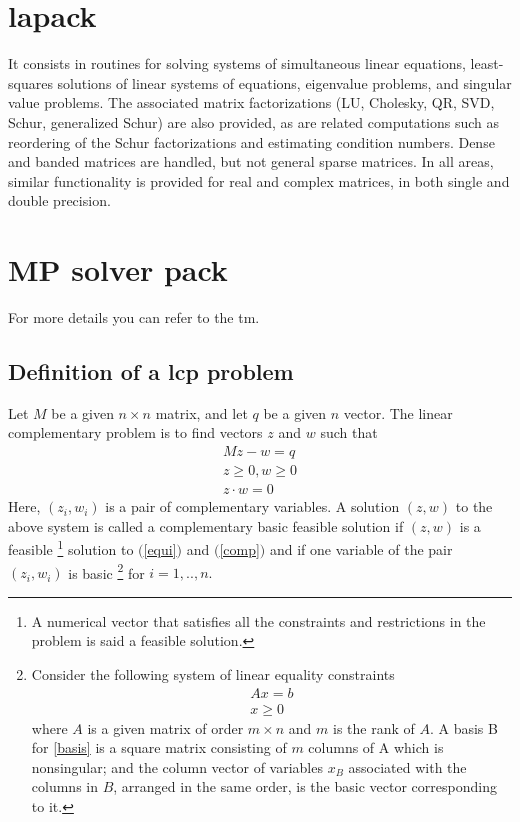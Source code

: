 \section{\ac{lapack}}
It consists in routines for solving systems of simultaneous linear equations, least-squares solutions of linear systems of equations, eigenvalue problems, and singular value problems. The associated matrix factorizations (LU, Cholesky, QR, SVD, Schur, generalized Schur) are also provided, as are related computations such as reordering of the Schur factorizations and estimating condition numbers. Dense and banded matrices are handled, but not general sparse matrices. In all areas, similar functionality is provided for real and complex matrices, in both single and double precision.

\section{MP solver pack}

For more details you can refer to the \ac{tm}.

\subsection{Definition of a \acs{lcp} problem}
Let $M$ be a given $n\times n$ matrix, and let $q$ be a given $n$ vector. The linear complementary problem is to find vectors $z$ and $w$ such that
\begin{eqnarray}
M z - w = q \label{equi}\\
z \ge 0, w \ge 0\label{comp}\\
z \cdot w = 0 \label{pdt}
\end{eqnarray}
%
Here, $(z_{i},w_{i})$ is a pair of complementary variables. A solution $(z,w)$ to the above system is called a complementary basic feasible solution if $(z,w)$ is a feasible%
\footnote{A numerical vector that satisfies all the constraints and restrictions in the problem is said a feasible solution.}
solution to $($\ref{equi}$)$ and $($\ref{comp}$)$ and if one variable of the pair $(z_{i},w_{i})$ is  basic%
\footnote{Consider the following system of linear equality constraints 
\begin{eqnarray}
A x = b \label{basis} \\
x \geq 0
\end{eqnarray}
where $A$ is a given matrix of order $m\times n$ and $m$ is the rank of $A$.
A basis B for \ref{basis} is a square matrix consisting of $m$ columns of A which is nonsingular; and the column vector of variables $x_{B}$ associated with the columns in $B$, arranged in the same order, is the basic vector corresponding to it.
} 
for $i=1,..,n.$




